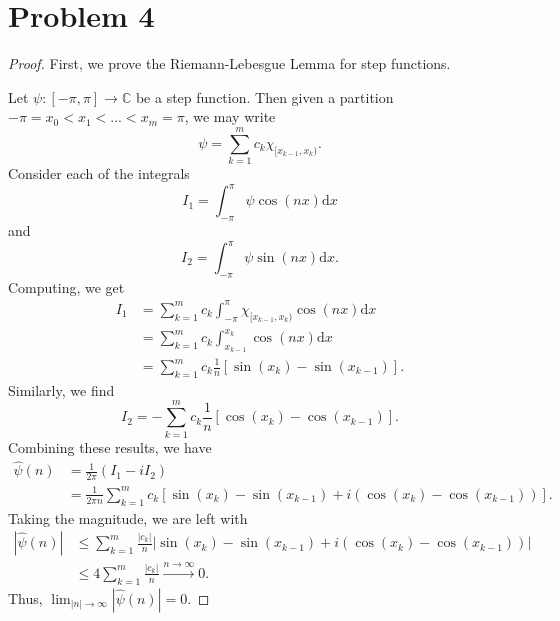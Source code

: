 \documentclass{article}
\newcommand{\C}{\mathbb{C}} %
\begin{document}
\section*{Problem 4}
\begin{proof}
	First, we prove the Riemann-Lebesgue Lemma for step functions.
	
	Let $\psi: [-\pi, \pi] \to \C$ be a step function. Then given a partition \\$-\pi = x_0 < x_1 < ... < x_m = \pi$, we may write
	\begin{equation}
		\psi = \sum_{k=1}^m c_k \chi_{[x_{k-1}, x_k)}.
	\end{equation}
	Consider each of the integrals
	\begin{equation}
		I_1 = \int_{-\pi}^{\pi} \psi \cos{(nx)}\mathrm{d}x
	\end{equation}
	and
	\begin{equation}
		I_2 = \int_{-\pi}^{\pi}\psi \sin{(nx)} \mathrm{d}x.
	\end{equation}
	Computing, we get
	\begin{align}
		I_1 &= \sum_{k=1}^m c_k \int_{-\pi}^{\pi}\chi_{[x_{k-1}, x_k)}\cos{(nx)}\mathrm{d}x \\
		&= \sum_{k=1}^m c_k \int_{x_{k-1}}^{x_k}\cos{(nx)} \mathrm{d}x \\
		&= \sum_{k=1}^m c_k \frac{1}{n} \left[\sin{(x_k)} - \sin{(x_{k-1})}\right].
	\end{align}
	Similarly, we find
	\begin{equation}
		I_2 = -\sum_{k=1}^m c_k \frac{1}{n}\left[\cos{(x_k)} - \cos{(x_{k-1})}\right].
	\end{equation}
	Combining these results, we have
	\begin{align}
		\hat{\psi}(n) &= \frac{1}{2\pi}(I_1 - iI_2) \\
		&= \frac{1}{2\pi n}\sum_{k=1}^m c_k \left[\sin{(x_k)} - \sin{(x_{k-1})} + i \left(\cos{(x_k)} - \cos{(x_{k-1})}\right)\right].
	\end{align}
	Taking the magnitude, we are left with
	\begin{align}
		|\hat{\psi}(n)| &\leq \sum_{k=1}^m \frac{|c_k|}{n}\left|\sin{(x_k)} - \sin{(x_{k-1})} + i \left(\cos{(x_k)} - \cos{(x_{k-1})}\right)\right| \\
		&\leq 4 \sum_{k=1}^m \frac{|c_k|}{n} \xrightarrow{n \to \infty} 0.
	\end{align}
	Thus, $\lim_{|n| \to \infty}|\hat{\psi}(n)| = 0$.
	

\end{proof}
\end{document}
